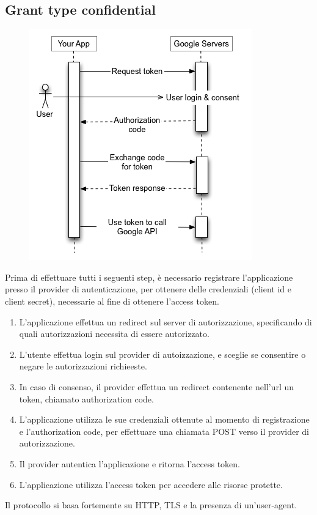 \documentclass[11pt]{style}
\begin{document}
\subsection{Grant type confidential}
\begin{figure}[h]
    \centering
    \includegraphics[width=.6\textwidth]{authorization-code.png}
\end{figure}
Prima di effettuare tutti i seguenti step, è necessario registrare
l'applicazione presso il provider di autenticazione, per ottenere delle
credenziali (client id e client secret), necessarie al fine di ottenere
l'access token.
\begin{enumerate}
    \item L'applicazione effettua un redirect sul server di autorizzazione,
        specificando di quali autorizzazioni necessita di essere autorizzato.
    \item L'utente effettua login sul provider di autoizzazione, e sceglie
        se consentire o negare le autorizzazioni richieeste.
    \item In caso di consenso, il provider effettua un redirect contenente nell'url
        un token, chiamato authorization code.
    \item L'applicazione utilizza le sue credenziali ottenute al momento di
        registrazione e l'authorization code, per effettuare una chiamata POST
        verso il provider di autorizzazione.
    \item Il provider autentica l'applicazione e ritorna l'access token.
    \item L'applicazione utilizza l'access token per accedere alle risorse protette.
\end{enumerate}

Il protocollo si basa fortemente su HTTP, TLS e la presenza di un'user-agent.
\end{document}
